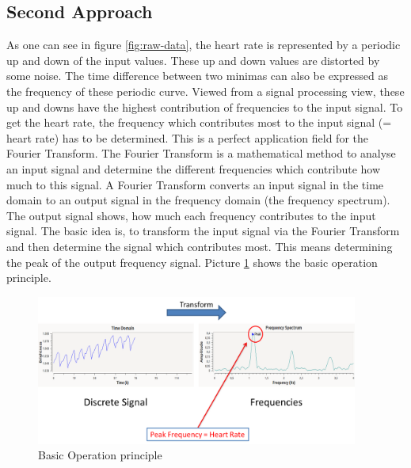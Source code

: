 \documentclass[notitlepage]{scrreprt}
\begin{document}
\subsection{Second Approach}
As one can see in figure \ref{fig:raw-data}, the heart rate is represented by a periodic up and down of the input values. These up and down values are distorted by some noise. The time difference between two minimas can also be expressed as the frequency of these periodic curve. Viewed from a signal processing view, these up and downs have the highest contribution of frequencies to the input signal. To get the heart rate, the frequency which contributes most to the input signal (= heart rate) has to be determined. This is a perfect application field for the Fourier Transform. The Fourier Transform is a mathematical method to analyse an input signal and determine the different frequencies which contribute how much to this signal. A Fourier Transform converts an input signal in the time domain to an output signal in the frequency domain (the frequency spectrum). The output signal shows, how much each frequency contributes to the input signal. The basic idea is, to transform the input signal via the Fourier Transform and then determine the signal which contributes most. This means determining the peak of the output frequency signal. Picture \ref{fig:basic-operation} shows the basic operation principle.

\begin{figure}[H]
	\centering
	\includegraphics[width=400px]{images/basicOperation.png}
	\caption{Basic Operation principle}
	\label{fig:basic-operation}
\end{figure}
\end{document}
